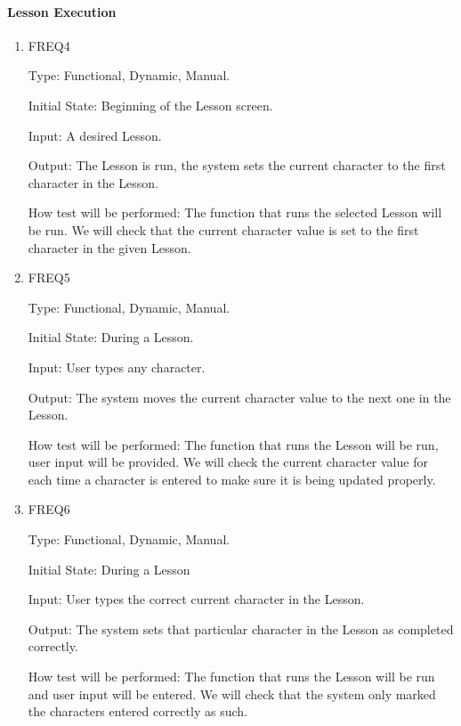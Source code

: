 \documentclass[12pt, titlepage]{article}
\begin{document}
\paragraph{Lesson Execution}
\begin{enumerate}
    					
\item{FREQ4\\}

Type: Functional, Dynamic, Manual.
					
Initial State: Beginning of the Lesson screen.
					
Input: A desired Lesson.
					
Output: The Lesson is run, the system sets the current character to the first character in the Lesson.
					
How test will be performed: The function that runs the selected Lesson will be run. We will check that the current character value is set to the first character in the given Lesson.

					
\item{FREQ5\\}

Type: Functional, Dynamic, Manual.
					
Initial State: During a Lesson.
					
Input: User types any character.
					
Output: The system moves the current character value to the next one in the Lesson.
					
How test will be performed: The function that runs the Lesson will be run, user input will be provided. We will check the current character value for each time a character is entered to make sure it is being updated properly.

					
\item{FREQ6\\}

Type: Functional, Dynamic, Manual.
					
Initial State: During a Lesson
					
Input: User types the correct current character in the Lesson.
					
Output: The system sets that particular character in the Lesson as completed correctly.
					
How test will be performed: The function that runs the Lesson will be run and user input will be entered. We will check that the system only marked the characters entered correctly as such.


\end{enumerate}
\end{document}
